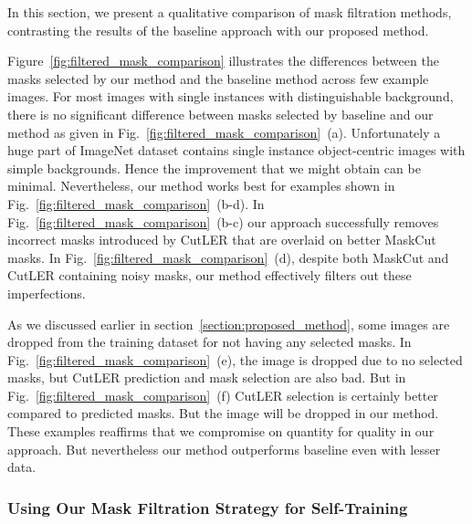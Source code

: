 In this section, we present a qualitative comparison of mask filtration methods, contrasting the results of the baseline approach with our proposed method.

Figure~\ref{fig:filtered_mask_comparison} illustrates the differences between the masks selected by our method and the baseline method across few example images. For most images with single instances with distinguishable background, there is no significant difference between masks selected by baseline and our method as given in Fig.~\ref{fig:filtered_mask_comparison}~(a). Unfortunately a huge part of ImageNet dataset contains single instance object-centric images with simple backgrounds. Hence the improvement that we might obtain can be minimal. Nevertheless, our method works best for examples shown in Fig.~\ref{fig:filtered_mask_comparison}~(b-d). In Fig.~\ref{fig:filtered_mask_comparison}~(b-c) our approach successfully removes incorrect masks introduced by CutLER that are overlaid on better MaskCut masks. In Fig.~\ref{fig:filtered_mask_comparison}~(d), despite both MaskCut and CutLER containing noisy masks, our method effectively filters out these imperfections.

As we discussed earlier in section~\ref{section:proposed_method}, some images are dropped from the training dataset for not having any selected masks. In Fig.~\ref{fig:filtered_mask_comparison}~(e), the image is dropped due to no selected masks, but CutLER prediction and mask selection are also bad. But in Fig.~\ref{fig:filtered_mask_comparison}~(f) CutLER selection is certainly better compared to predicted masks. But the image will be dropped in our method. These examples reaffirms that we compromise on quantity for quality in our approach. But nevertheless our method outperforms baseline even with lesser data.

\subsubsection{Using Our Mask Filtration Strategy for Self-Training}

\begin{table}[htbp]
	\centering
	\caption[\textbf{\(AP_{box}\) and \(AP50_{box}\) for Training and First Self-Training Round}]{\textbf{\(AP_{box}\) and \(AP50_{box}\) for Training and Self-Training} evaluated on COCO Eval dataset (Batch size 8) using our mask filtration for self-training}
	\label{tab:combined_train_and_r1}
\end{table}

